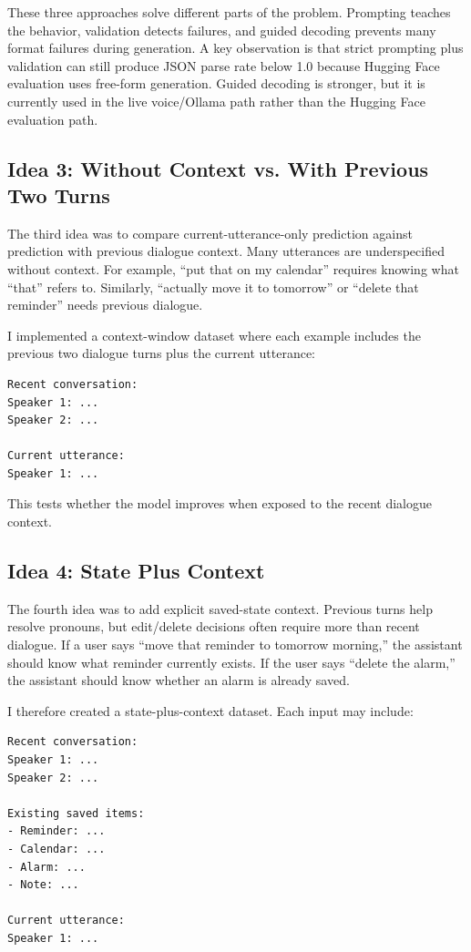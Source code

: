 \documentclass[11pt,a4paper]{article}
\begin{document}
These three approaches solve different parts of the problem. Prompting teaches the behavior, validation detects failures, and guided decoding prevents many format failures during generation. A key observation is that strict prompting plus validation can still produce JSON parse rate below 1.0 because Hugging Face evaluation uses free-form generation. Guided decoding is stronger, but it is currently used in the live voice/Ollama path rather than the Hugging Face evaluation path.

\subsection{Idea 3: Without Context vs. With Previous Two Turns}

The third idea was to compare current-utterance-only prediction against prediction with previous dialogue context. Many utterances are underspecified without context. For example, ``put that on my calendar'' requires knowing what ``that'' refers to. Similarly, ``actually move it to tomorrow'' or ``delete that reminder'' needs previous dialogue.

I implemented a context-window dataset where each example includes the previous two dialogue turns plus the current utterance:
\begin{verbatim}
Recent conversation:
Speaker 1: ...
Speaker 2: ...

Current utterance:
Speaker 1: ...
\end{verbatim}


This tests whether the model improves when exposed to the recent dialogue context.

\subsection{Idea 4: State Plus Context}

The fourth idea was to add explicit saved-state context. Previous turns help resolve pronouns, but edit/delete decisions often require more than recent dialogue. If a user says ``move that reminder to tomorrow morning,'' the assistant should know what reminder currently exists. If the user says ``delete the alarm,'' the assistant should know whether an alarm is already saved.

I therefore created a state-plus-context dataset. Each input may include:
\begin{verbatim}
Recent conversation:
Speaker 1: ...
Speaker 2: ...

Existing saved items:
- Reminder: ...
- Calendar: ...
- Alarm: ...
- Note: ...

Current utterance:
Speaker 1: ...
\end{verbatim}
\end{document}
